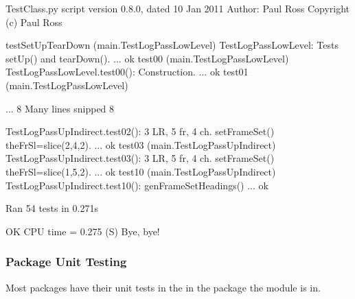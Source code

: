 \documentclass[letterpaper,10pt,english]{sphinxmanual}
\begin{document}
\begin{sphinxVerbatim}[commandchars=\\\{\}]
TestClass.py script version \PYGZdq{}0.8.0\PYGZdq{}, dated 10 Jan 2011
Author: Paul Ross
Copyright (c) Paul Ross

testSetUpTearDown (\PYGZus{}\PYGZus{}main\PYGZus{}\PYGZus{}.TestLogPass\PYGZus{}LowLevel)
TestLogPass\PYGZus{}LowLevel: Tests setUp() and tearDown(). ... ok
test\PYGZus{}00 (\PYGZus{}\PYGZus{}main\PYGZus{}\PYGZus{}.TestLogPass\PYGZus{}LowLevel)
TestLogPass\PYGZus{}LowLevel.test\PYGZus{}00(): Construction. ... ok
test\PYGZus{}01 (\PYGZus{}\PYGZus{}main\PYGZus{}\PYGZus{}.TestLogPass\PYGZus{}LowLevel)

... 8\PYGZlt{}\PYGZhy{}\PYGZhy{}\PYGZhy{}\PYGZhy{}\PYGZhy{}\PYGZhy{}\PYGZhy{}\PYGZhy{} Many lines snipped \PYGZhy{}\PYGZhy{}\PYGZhy{}\PYGZhy{}\PYGZhy{}\PYGZhy{}\PYGZhy{}\PYGZhy{}\PYGZgt{}8

TestLogPass\PYGZus{}UpIndirect.test\PYGZus{}02(): 3 LR, 5 fr, 4 ch. setFrameSet() theFrSl=slice(2,4,2). ... ok
test\PYGZus{}03 (\PYGZus{}\PYGZus{}main\PYGZus{}\PYGZus{}.TestLogPass\PYGZus{}UpIndirect)
TestLogPass\PYGZus{}UpIndirect.test\PYGZus{}03(): 3 LR, 5 fr, 4 ch. setFrameSet() theFrSl=slice(1,5,2). ... ok
test\PYGZus{}10 (\PYGZus{}\PYGZus{}main\PYGZus{}\PYGZus{}.TestLogPass\PYGZus{}UpIndirect)
TestLogPass\PYGZus{}UpIndirect.test\PYGZus{}10(): genFrameSetHeadings() ... ok

\PYGZhy{}\PYGZhy{}\PYGZhy{}\PYGZhy{}\PYGZhy{}\PYGZhy{}\PYGZhy{}\PYGZhy{}\PYGZhy{}\PYGZhy{}\PYGZhy{}\PYGZhy{}\PYGZhy{}\PYGZhy{}\PYGZhy{}\PYGZhy{}\PYGZhy{}\PYGZhy{}\PYGZhy{}\PYGZhy{}\PYGZhy{}\PYGZhy{}\PYGZhy{}\PYGZhy{}\PYGZhy{}\PYGZhy{}\PYGZhy{}\PYGZhy{}\PYGZhy{}\PYGZhy{}\PYGZhy{}\PYGZhy{}\PYGZhy{}\PYGZhy{}\PYGZhy{}\PYGZhy{}\PYGZhy{}\PYGZhy{}\PYGZhy{}\PYGZhy{}\PYGZhy{}\PYGZhy{}\PYGZhy{}\PYGZhy{}\PYGZhy{}\PYGZhy{}\PYGZhy{}\PYGZhy{}\PYGZhy{}\PYGZhy{}\PYGZhy{}\PYGZhy{}\PYGZhy{}\PYGZhy{}\PYGZhy{}\PYGZhy{}\PYGZhy{}\PYGZhy{}\PYGZhy{}\PYGZhy{}\PYGZhy{}\PYGZhy{}\PYGZhy{}\PYGZhy{}\PYGZhy{}\PYGZhy{}\PYGZhy{}\PYGZhy{}\PYGZhy{}\PYGZhy{}
Ran 54 tests in 0.271s

OK
CPU time =    0.275 (S)
Bye, bye!
\end{sphinxVerbatim}


\subsubsection{Package Unit Testing}
\label{\detokenize{testing/unit_tests:package-unit-testing}}
Most packages have their unit tests in the  in the package the module is in.
\end{document}
